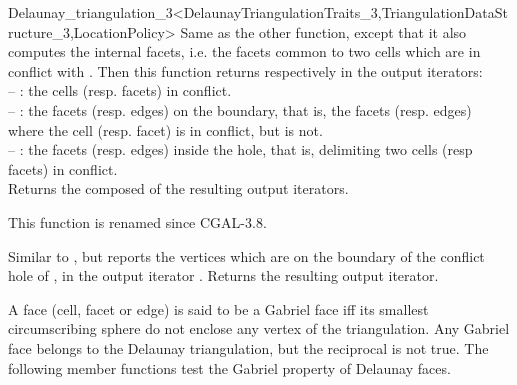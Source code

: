 \begin{ccRefClass}{Delaunay_triangulation_3<DelaunayTriangulationTraits_3,TriangulationDataStructure_3,LocationPolicy>}
{Same as the other  function, except that it also 
computes the internal facets, i.e. the facets common to two cells which
are in conflict with .
Then this function returns respectively in the output iterators:\\
-- : the cells (resp. facets) in conflict.\\
-- : the facets (resp. edges) on the boundary, that is, the facets
(resp. edges)  where the cell (resp. facet)  is in
conflict, but  is not.\\
-- : the facets (resp. edges) inside the hole, that is, delimiting
two cells (resp facets) in conflict.\\
Returns the  composed of the resulting output iterators.
}

\begin{ccDeprecated}
{This function is renamed  since CGAL-3.8.}
\end{ccDeprecated}
{Similar to , but reports the vertices which are on the
boundary of the conflict hole of , in the output iterator .
Returns the resulting output iterator.
}

A face (cell, facet or edge) is said to be a Gabriel face iff
its   smallest circumscribing sphere do not enclose
any vertex of the triangulation.  Any Gabriel face belongs to the
Delaunay triangulation, but the reciprocal is not true.
The following member functions test the Gabriel property of
Delaunay faces.
\ccGlue 
{}
\ccGlue 
{}
\ccGlue
{} {}



\end{ccRefClass}

